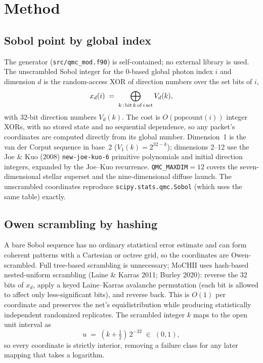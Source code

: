\documentclass[english,a4paper]{my_memo}
\newcommand{\code}[1]{\texttt{#1}}
\begin{document}
\section{Method}
\label{sec:method}

\subsection{Sobol point by global index}
The generator (\code{src/qmc\_mod.f90}) is self-contained; no external library
is used.  The unscrambled Sobol integer for the 0-based global photon index $i$
and dimension $d$ is the random-access XOR of direction numbers over the set
bits of $i$,
\begin{equation}
  x_d(i) \;=\; \bigoplus_{k\,:\,{\rm bit}\,k\,{\rm of}\,i\,{\rm set}} V_d(k),
\end{equation}
with 32-bit direction numbers $V_d(k)$.  The cost is $O(\mathrm{popcount}(i))$
integer XORs, with no stored state and no sequential dependence, so any packet's
coordinates are computed directly from its global number.  Dimension~1 is the
van der Corput sequence in base~2 ($V_1(k) = 2^{32-k}$); dimensions 2--12 use
the Joe \& Kuo (2008) \code{new-joe-kuo-6} primitive polynomials and initial
direction integers, expanded by the Joe--Kuo recurrence.  \code{QMC\_MAXDIM}${}
= 12$ covers the seven-dimensional stellar superset and the nine-dimensional
diffuse launch.  The unscrambled coordinates reproduce
\code{scipy.stats.qmc.Sobol} (which uses the same table) exactly.

\subsection{Owen scrambling by hashing}
A bare Sobol sequence has no ordinary statistical error estimate and can form
coherent patterns with a Cartesian or octree grid, so the coordinates are
Owen-scrambled.  Full tree-based scrambling is unnecessary; MoCHII uses
hash-based nested-uniform scrambling (Laine \& Karras 2011; Burley 2020):
reverse the 32 bits of $x_d$, apply a keyed Laine--Karras avalanche permutation
(each bit is allowed to affect only less-significant bits), and reverse back.
This is $O(1)$ per coordinate and preserves the net's equidistribution while
producing statistically independent randomized replicates.  The scrambled
integer $k$ maps to the open unit interval as
\begin{equation}
  u \;=\; (k + \tfrac12)\,2^{-32} \;\in\; (0,1),
\end{equation}
so every coordinate is strictly interior, removing a failure class for any later
mapping that takes a logarithm.
\end{document}
